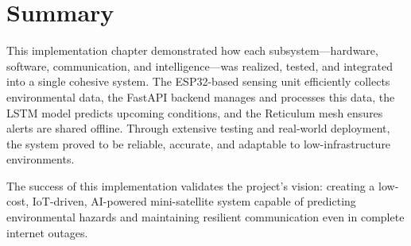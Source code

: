 \section{Summary}
\label{sec:impl_summary}

This implementation chapter demonstrated how each subsystem—hardware, software, communication, and intelligence—was realized, tested, and integrated into a single cohesive system. The ESP32-based sensing unit efficiently collects environmental data, the FastAPI backend manages and processes this data, the LSTM model predicts upcoming conditions, and the Reticulum mesh ensures alerts are shared offline. Through extensive testing and real-world deployment, the system proved to be reliable, accurate, and adaptable to low-infrastructure environments.

The success of this implementation validates the project’s vision: creating a low-cost, IoT-driven, AI-powered mini-satellite system capable of predicting environmental hazards and maintaining resilient communication even in complete internet outages.
